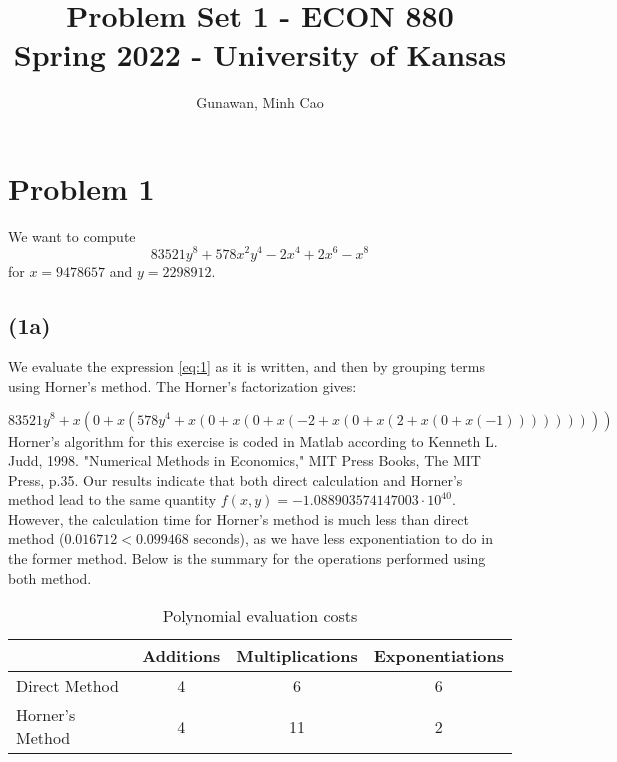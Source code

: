 \documentclass[11pt]{article}
\title{Problem Set 1 - ECON 880\\
	\small Spring 2022 - University of Kansas}
\author{Gunawan, Minh Cao}
\newcommand{\1}{\mathbbm{1}}
\begin{document}
\maketitle	
\section*{Problem 1}
We want to compute
\begin{equation}\label{eq:1}
	83521y^8 +578x^2 y^4 -2x^4 +2x^6 -x^8
\end{equation}
for $x = 9478657$ and $y = 2298912$.
\subsection*{(1a)}
We evaluate the expression \eqref{eq:1} as it is written, and then by grouping terms using Horner's method. The Horner's factorization gives:

\begin{equation*}
	83521y^8+x(0+x(578y^4+x(0+x(0+x(-2+x(0+x(2+x(0+x(-1)))))))))
\end{equation*}
Horner's algorithm for this exercise is coded in Matlab according to Kenneth L. Judd, 1998. "Numerical Methods in Economics," MIT Press Books, The MIT Press, p.35. Our results indicate that both direct calculation and Horner's method lead to the same quantity $f(x,y) = -1.088903574147003\cdot 10^{40}$. However, the calculation time for Horner's method is much less than direct method ($0.016712 < 0.099468$ seconds), as we have less exponentiation to do in the former method. Below is the summary for the operations performed using both method.

	\begin{table}[h]
	\centering
	\begin{tabular}{l  c c c }
		\hline
		\hline
						& Additions & Multiplications & Exponentiations \\
		\hline
		Direct Method 	&4			&6&6\\
		Horner's Method &4			&11&2\\
		\hline
		\hline
	\end{tabular} 
	\caption{Polynomial evaluation costs}
	\label{tab:0}
\end{table}
\end{document}
